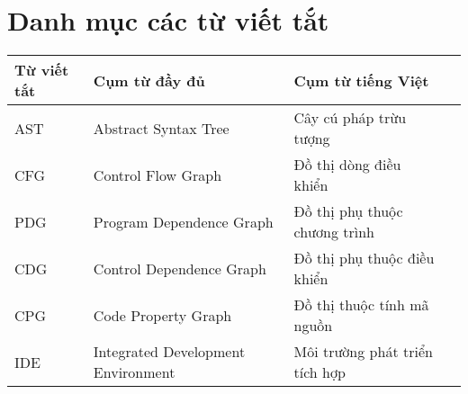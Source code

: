 \chapter*{Danh mục các từ viết tắt}


\begin{table}[h]
\begin{tabularx}{\textwidth}{|l|l|X|X|}
\hline
\textbf{Từ viết tắt} & \textbf{Cụm từ đầy đủ} & \textbf{Cụm từ tiếng Việt} \\
\hline
AST & Abstract Syntax Tree & Cây cú pháp trừu tượng \\
\hline
CFG & Control Flow Graph & Đồ thị dòng điều khiển \\
\hline
PDG & Program Dependence Graph & Đồ thị phụ thuộc chương trình \\
\hline
CDG & Control Dependence Graph & Đồ thị phụ thuộc điều khiển \\
\hline
CPG & Code Property Graph & Đồ thị thuộc tính mã nguồn \\
\hline
IDE & Integrated Development Environment & Môi trường phát triển tích hợp \\
\hline
\end{tabularx}
\end{table}
